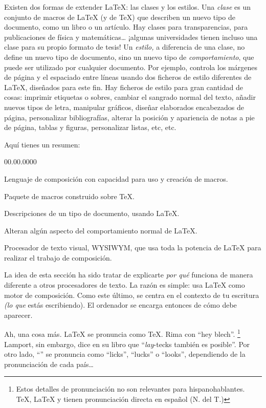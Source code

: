 Existen dos formas de extender \LaTeX{}: las clases y los estilos.
Una \emph{clase} es un conjunto de macros de \LaTeX{} (y de \TeX{})
que describen un nuevo tipo de documento, como un libro o un artículo.
Hay clases para transparencias, para publicaciones de física y matemáticas\ldots{}
¡algunas universidades tienen incluso una clase para su propio formato
de tesis! Un \emph{estilo,} a diferencia de una clase, no define un
nuevo tipo de documento, sino un nuevo tipo de \emph{comportamiento},
que puede ser utilizado por cualquier documento. Por ejemplo, \LyX{}
controla los márgenes de página y el espaciado entre líneas usando
dos ficheros de estilo diferentes de \LaTeX{}, diseñados para este
fin. Hay ficheros de estilo para gran cantidad de cosas: imprimir
etiquetas o sobres, cambiar el sangrado normal del texto, añadir nuevos
tipos de letra, manipular gráficos, diseñar elaborados encabezados
de página, personalizar bibliografías, alterar la posición y apariencia
de notas a pie de página, tablas y figuras, personalizar listas, etc,
etc.

Aquí tienes un resumen:

\begin{lyxlist}{00.00.0000}
\item [\TeX{}:]Lenguaje de composición con capacidad para uso y creación
de macros.
\item [\LaTeX{}:]Paquete de macros construido sobre \TeX{}\@.
\item [clases:]Descripciones de un tipo de documento, usando \LaTeX{}\@.
\item [estilos:]Alteran algún aspecto del comportamiento normal de \LaTeX{}.
\item [\LyX{}:]Procesador de texto visual, WYSIWYM, que usa toda la potencia
de \LaTeX{} para realizar el trabajo de composición.
\end{lyxlist}
La idea de esta sección ha sido tratar de explicarte \emph{por qué}
\LyX{} funciona de manera diferente a otros procesadores de texto.
La razón es simple: usa \LaTeX{} como motor de composición. Como este
último, se centra en el contexto de tu escritura \emph{(lo que} estás
escribiendo). El ordenador se encarga entonces de cómo debe aparecer.

Ah, una cosa más. \LaTeX{} se pronuncia como \TeX{}. Rima con {}``hey
blech''.%
\footnote{Estos detalles de pronunciación no son relevantes para hispanohablantes.
\TeX{}, \LaTeX{} y \LyX{} tienen pronunciación directa en español
(N. del T.)%
} Lamport, sin embargo, dice en su libro que {}``\emph{lay}-tecks
también es posible''. Por otro lado, {}``\LyX{}'' se pronuncia
como {}``licks'', {}``lucks'' o {}``looks'', dependiendo de
la pronunciación de cada país\ldots{}


